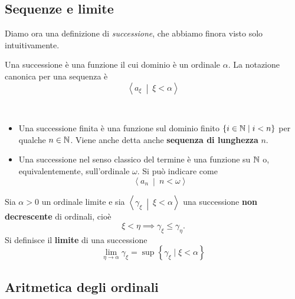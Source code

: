 \subsection{Sequenze e limite}
Diamo ora una definizione di \textit{successione}, che abbiamo finora visto solo intuitivamente.
\begin{define}[Successione]
	Una successione è una funzione il cui dominio è un ordinale $\alpha$. La notazione canonica per una sequenza è
	\begin{equation*}
		\left<a_\xi \ \middle| \ \xi<\alpha\right>
	\end{equation*}
\end{define}
\begin{examples}~
	\begin{itemize}
		\item Una successione finita è una funzione sul dominio finito $\left\{i\in\mathbb{N}\mid i<n\right\}$ per qualche $n\in\mathbb{N}$. Viene anche detta anche \textbf{sequenza di lunghezza} $n$.
		\item Una successione nel senso classico del termine è una funzione su $\mathbb{N}$ o, equivalentemente, sull'ordinale $\omega$. Si può indicare come
			\begin{equation*}
			\left<a_n \ \middle| \ n<\omega\right>
		\end{equation*}
	\end{itemize}
\end{examples}
\begin{define}
	Sia $\alpha>0$ un ordinale limite e sia $\left<\gamma_\xi \ \middle| \ \xi<\alpha\right>$ una successione \textbf{non decrescente} di ordinali, cioè
	\begin{equation*}
		\xi <\eta \implies \gamma_\xi\leq \gamma_\eta.
	\end{equation*}
	Si definisce il \textbf{limite} di una successione
	\begin{equation}
		\lim_{\eta\to \alpha}\gamma_\xi=\sup\left\{\gamma_\xi\mid\xi<\alpha\right\}
	\end{equation}
\end{define}
\subsection{Aritmetica degli ordinali}
